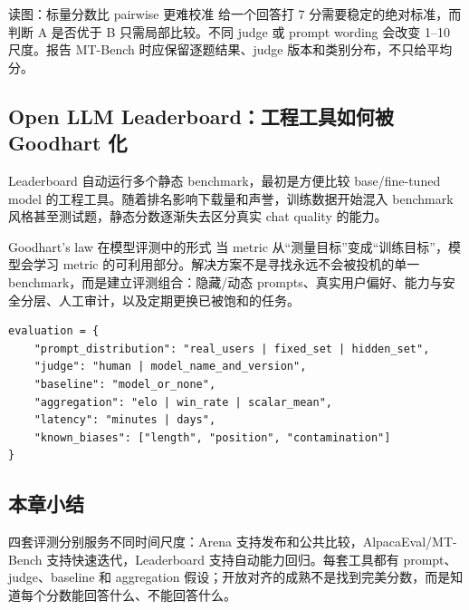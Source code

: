 

\begin{knowledgebox}{读图：标量分数比 pairwise 更难校准}
给一个回答打 7 分需要稳定的绝对标准，而判断 A 是否优于 B 只需局部比较。不同 judge 或 prompt wording 会改变 1--10 尺度。报告 MT-Bench 时应保留逐题结果、judge 版本和类别分布，不只给平均分。
\end{knowledgebox}


\subsection{Open LLM Leaderboard：工程工具如何被 Goodhart 化}

Leaderboard 自动运行多个静态 benchmark，最初是方便比较 base/fine-tuned model 的工程工具。随着排名影响下载量和声誉，训练数据开始混入 benchmark 风格甚至测试题，静态分数逐渐失去区分真实 chat quality 的能力。



\begin{importantbox}{Goodhart's law 在模型评测中的形式}
当 metric 从“测量目标”变成“训练目标”，模型会学习 metric 的可利用部分。解决方案不是寻找永远不会被投机的单一 benchmark，而是建立评测组合：隐藏/动态 prompts、真实用户偏好、能力与安全分层、人工审计，以及定期更换已被饱和的任务。
\end{importantbox}


\begin{lstlisting}[caption={评测 portfolio 的最小记录结构}]
evaluation = {
    "prompt_distribution": "real_users | fixed_set | hidden_set",
    "judge": "human | model_name_and_version",
    "baseline": "model_or_none",
    "aggregation": "elo | win_rate | scalar_mean",
    "latency": "minutes | days",
    "known_biases": ["length", "position", "contamination"]
}
\end{lstlisting}

\subsection{本章小结}

四套评测分别服务不同时间尺度：Arena 支持发布和公共比较，AlpacaEval/MT-Bench 支持快速迭代，Leaderboard 支持自动能力回归。每套工具都有 prompt、judge、baseline 和 aggregation 假设；开放对齐的成熟不是找到完美分数，而是知道每个分数能回答什么、不能回答什么。

